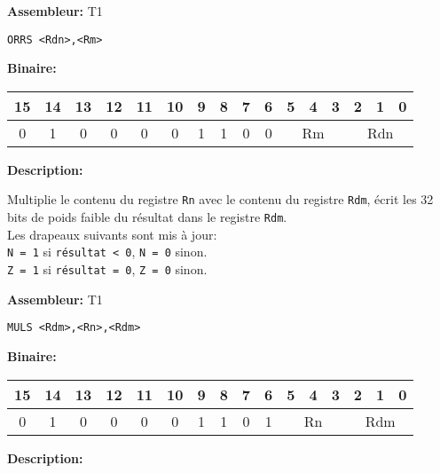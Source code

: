\documentclass{article}
\begin{document}
    \textbf{Assembleur:} T1

    \begin{lstlisting}
ORRS <Rdn>,<Rm>
    \end{lstlisting}

    \textbf{Binaire:}

    \begin{tabular}{| c c c c c c c c c c c c c c c c |}
        \hline
        15 & 14 & 13 & 12 & 11 & 10 & \multicolumn{1}{|c}{9} & 8 & 7 & 6 & \multicolumn{1}{|c}{5} & 4 & 3 & \multicolumn{1}{|c}{2} & 1 & 0 \\
        \hline
        0 & 1 & 0 & 0 & 0 & 0 & \multicolumn{1}{|c}{1} & 1 & 0 & 0 & \multicolumn{3}{|c}{Rm} & \multicolumn{3}{|c|}{Rdn} \\
        \hline
    \end{tabular}



    \textbf{Description: }

    Multiplie le contenu du registre \texttt{Rn} avec le contenu du registre \texttt{Rdm}, écrit les 32 bits de poids faible du résultat dans le registre \texttt{Rdm}.\\
    Les drapeaux suivants sont mis à jour:\\
    \texttt{N = 1} si \texttt{résultat < 0}, \texttt{N = 0} sinon.\\
    \texttt{Z = 1} si \texttt{résultat = 0}, \texttt{Z = 0} sinon.

    \textbf{Assembleur:} T1

    \begin{lstlisting}
MULS <Rdm>,<Rn>,<Rdm>
    \end{lstlisting}

    \textbf{Binaire:}

    \begin{tabular}{| c c c c c c c c c c c c c c c c |}
        \hline
        15 & 14 & 13 & 12 & 11 & 10 & \multicolumn{1}{|c}{9} & 8 & 7 & 6 & \multicolumn{1}{|c}{5} & 4 & 3 & \multicolumn{1}{|c}{2} & 1 & 0 \\
        \hline
        0 & 1 & 0 & 0 & 0 & 0 & \multicolumn{1}{|c}{1} & 1 & 0 & 1 & \multicolumn{3}{|c}{Rn} & \multicolumn{3}{|c|}{Rdm} \\
        \hline
    \end{tabular}



    \textbf{Description: }
\end{document}
